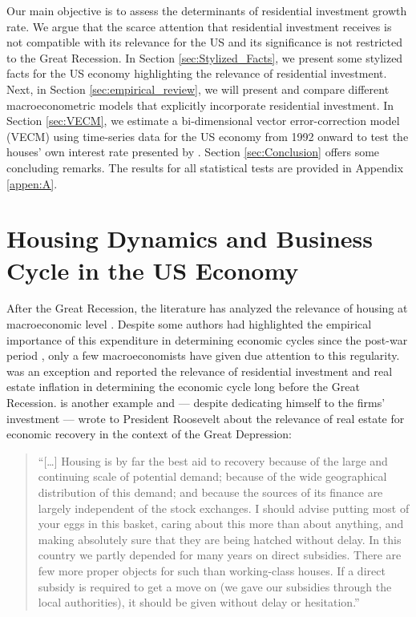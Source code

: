 \documentclass[12pt, a4]{article}
\begin{document}
Our main objective is to assess the determinants of residential investment growth rate.
We argue that the scarce attention that residential investment receives is not compatible with its relevance for the US and its significance is not restricted to the Great Recession.
In Section \ref{sec:Stylized_Facts}, we present some stylized facts for the US economy highlighting the relevance of residential investment.
Next, in Section \ref{sec:empirical_review}, we will present and compare different macroeconometric models that explicitly incorporate residential investment.
In Section \ref{sec:VECM}, we estimate a bi-dimensional vector error-correction model (VECM) using time-series data for the US economy from 1992 onward to test the houses' own interest rate presented by \textcite{teixeira_crescimento_2015}. 
Section \ref{sec:Conclusion} offers some concluding remarks.
The results for all statistical tests are provided in Appendix \ref{appen:A}.



\section{Housing Dynamics and Business Cycle in the US Economy}
\label{sec:org9ffcbd8}
\label{sec:Stylized_Facts}
After the Great Recession, the literature has analyzed the relevance of housing at macroeconomic level \cites{leamer_housing_2015}{teixeira_crescimento_2015}{fiebiger_semi-autonomous_2018}.
Despite some authors had highlighted the empirical importance of this expenditure in determining economic cycles since the post-war period \cites{grebler_capital_1956}{green_follow_1997}{leamer_housing_2007}, only a few macroeconomists have given due attention to this regularity.
\textcite{duesenberry_investment_1958} was an exception and reported the relevance of residential investment and real estate inflation in
determining the economic cycle long before the Great Recession.
\textcite{keynes_collected_1978} is another example and --- despite dedicating himself to the firms' investment --- wrote to President Roosevelt about the relevance of real estate for economic recovery in the context of the Great Depression:

\begin{quote}
    ``[\ldots{}] Housing is by far the best aid to recovery because of the large and continuing scale
of potential demand; because of the wide geographical distribution of this demand; and
because the sources of its finance are largely independent of the stock exchanges. I should
advise putting most of your eggs in this basket, caring about this more than about anything,
and making absolutely sure that they are being hatched without delay. In this country we
partly depended for many years on direct subsidies. There are few more proper objects for
such than working-class houses. If a direct subsidy is required to get a move on (we gave
our subsidies through the local authorities), it should be given without delay or hesitation.''
\cite[p.~436]{keynes_collected_1978}
\end{quote}
\end{document}
